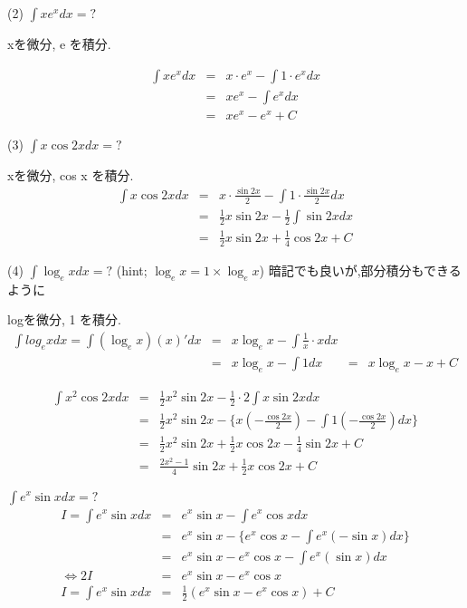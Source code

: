 (2) $\int x e^x dx =?$

xを微分, e を積分. 

\begin{eqnarray*}
\int x e^x dx &=& x\cdot e^x - \int 1\cdot e^x dx\\
&=& x e^x - \int e^x dx\\
 &= & x e^x - e^x +C
\end{eqnarray*}

(3) $\int x\cos 2x dx=?$

xを微分, cos x を積分. 
\begin{eqnarray*}
\int x\cos 2x dx &=& x\cdot\frac{\sin 2x}{2}-\int 1\cdot\frac{\sin 2x}{2}dx\\ 
 &= & \frac{1}{2}x\sin 2x - \frac{1}{2}\int\sin 2x dx\\
&=& \frac{1}{2}x \sin 2x + \frac{1}{4}\cos 2x +C
\end{eqnarray*}

(4) $\int \log_e x dx=?$
(hint; $\log_e x = 1\times\log_e x$)
暗記でも良いが,部分積分もできるように

logを微分, 1 を積分. 
\begin{eqnarray*}
 \int log_e x dx = \int(\log_e x)(x)' dx &=& x\log_e x - \int\frac{1}{x}\cdot x dx\\
&=& x\log_e x - \int 1 dx
&=& x\log_e x - x +C
\end{eqnarray*}

\begin{eqnarray*}
 \int x^2\cos 2x dx &=& \frac{1}{2}x^2\sin 2x - \frac{1}{2}\cdot 2\int x \sin 2x dx\\
&=& \frac{1}{2}x^2\sin 2x - \{x(-\frac{\cos 2x}{2})-\int 1(-\frac{\cos 2x}{2}) dx\}\\
&=& \frac{1}{2}x^2\sin 2x + \frac{1}{2}x \cos 2x-\frac{1}{4}\sin 2x +C\\
&=& \frac{2x^2-1}{4}\sin 2x+\frac{1}{2}x\cos 2x +C
\end{eqnarray*}

$\int e^x\sin x dx=?$
\begin{eqnarray*}
 I=\int e^x\sin x dx &=& e^x \sin x - \int e^x \cos x dx\\
&=& e^x \sin x - \{e^x\cos x - \int e^x(-\sin x)dx\}\\
&=& e^x \sin x - e^x\cos x - \int e^x(\sin x)dx \\
\Leftrightarrow 2I &=& e^x\sin x - e^x\cos x\\
I=\int e^x \sin x dx &=& \frac{1}{2}(e^x\sin x - e^x\cos x)+C
\end{eqnarray*}

